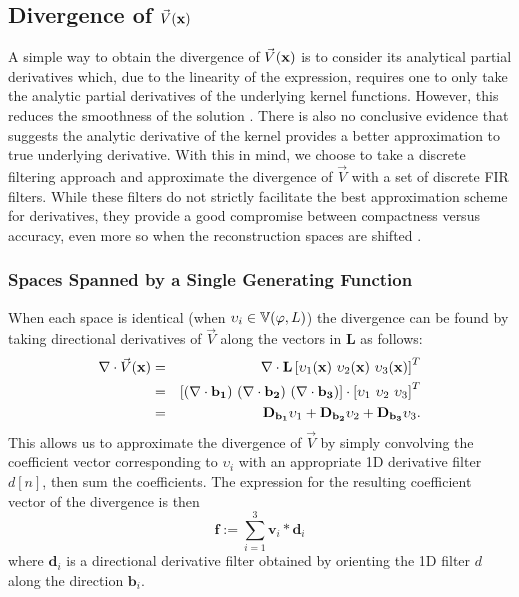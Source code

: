 \subsection{Divergence of $\vec{V}(\mathbf{x})$}
\label{sec:divergence}
A simple way to obtain the divergence of $\vec{V}(\mathbf{x})$ is to consider its analytical partial derivatives which, due to the linearity of the expression, requires one to only take the analytic partial derivatives of the underlying kernel functions. However, this reduces the smoothness of the solution \cite{zahgrad}. There is also no conclusive evidence that suggests the analytic derivative of the kernel provides a better approximation to true underlying derivative. With this in mind, we choose to take a discrete filtering approach and approximate the divergence of $\vec{V}$ with a set of discrete FIR filters. While these filters do not strictly facilitate the best approximation scheme for derivatives, they provide a good compromise between compactness versus accuracy, even more so when the reconstruction spaces are shifted \cite{gradrev}. 

\subsubsection{Spaces Spanned by a Single Generating Function}
When each space is identical (when $\upsilon_i \in \mathbb{V}(\varphi, L)$) the divergence can be found by taking directional derivatives of $\vec{V}$ along the vectors in $\mathbf{L}$ as follows: {\small 
\begin{eqnarray}\label{eq:div_dir}
	\grad \cdot \vec{V}(\vx) & = & \grad \cdot \mathbf{L} \left[\upsilon_1(\vx) \ \upsilon_2(\vx) \ \upsilon_3(\vx)\right]^T \notag \\
	 & = & \left[ \mathbf{(\grad \cdot b_1) \ (\grad \cdot b_2) \ (\grad \cdot b_3 ) }\right] \cdot \left[\upsilon_1 \ \upsilon_2 \ \upsilon_3\right]^T \\
	 & = & \dv{\mathbf{b_1}}\upsilon_1 + \dv{\mathbf{b_2}}\upsilon_2 + \dv{\mathbf{b_3}}\upsilon_3. \notag
\end{eqnarray} }
This allows us to approximate the divergence of $\vec{V}$ by simply convolving the coefficient vector corresponding to $\upsilon_i$ with an appropriate 1D derivative filter $d[n]$, then sum the coefficients. The expression for the resulting coefficient vector of the divergence is then {\small
\begin{equation}
	\mathbf{f}:= \sum_{i=1}^3{ \mathbf{v}_i*\mathbf{d}_i}
\label{eq:divergenceViaFiltering}
\end{equation}}
where $\mathbf{d}_i$ is a directional derivative filter obtained by orienting the 1D filter $d$ 
along the direction $\mathbf{b}_i.$ 

